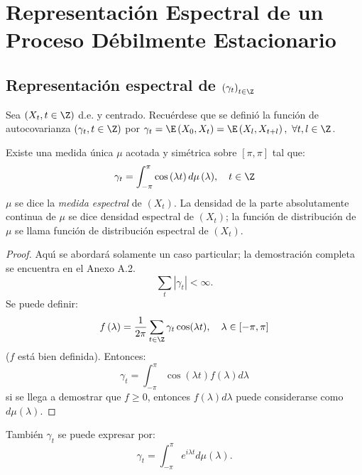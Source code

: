 \section{Representaci\'{o}n Espectral de un Proceso D\'{e}bilmente Estacionario}
\label{subsec:mylabel3}
\subsection{Representaci\'{o}n espectral de $\left( \gamma_{t} 
\right)_{t\in \Z}$ }
\label{subsubsec:mylabel1}

Sea $(X_{t}, t\in \Z)$ d.e. y centrado. Recu\'{e}rdese que se defini\'{o} la funci\'{o}n de autocovarianza $\left( \gamma_{t},t\in 
\Z \right)$ por $\gamma_{t}=\E\left( X_{0},X_{t} \right)=\E\left( X_{l},X_{t+l} \right),\ \forall t,l\in \Z$. 

\begin{teorema}
Existe una medida \'{u}nica $\mu $ acotada y sim\'{e}trica sobre $\left[ \pi ,\pi \right]$ tal que:
\[
\gamma_{t}=\int_{-\pi }^\pi {\cos \left( \lambda t \right)d\mu 
\left( \lambda \right)},\quad t\in \Z
\]
$\mu $ se dice la \emph{medida espectral} de $\left( X_{t} \right)$. La densidad de la parte 
absolutamente continua de $\mu $ se dice densidad espectral de $\left( X_{t} \right)$; la funci\'{o}n de distribuci\'{o}n de $\mu $ se llama funci\'{o}n de distribuci\'{o}n espectral de $\left( X_{t} \right)$.
 
\end{teorema}

\begin{proof}
Aqu\'{\i} se abordar\'{a} solamente un caso particular; la demostraci\'{o}n completa se encuentra en el Anexo A.2.
\[
\sum_t \left| \gamma_{t} \right| <\infty .
\]
Se puede definir:
\[
f\left( \lambda \right)=\frac{1}{2\pi }\sum_{t\in \Z} {\gamma 
_{t}\cos(\lambda t)} ,\quad \lambda \in 
\left[ -\pi ,\pi \right]
\]
($f$ est\'{a} bien definida). Entonces: 
\[
\gamma_{t}=\int_{-\pi }^\pi {\cos \left( \lambda t \right)f(\lambda 
)d\lambda } 
\]
si se llega a demostrar que $f\ge 0$, entonces $f(\lambda )d\lambda $ puede considerarse como $d\mu (\lambda )$.
\end{proof}

\begin{observacion}
Tambi\'{e}n $\gamma_{t}$ se puede expresar por: 
\[
\gamma_{t}=\int_{-\pi }^\pi {e^{i\lambda t}d\mu \left( \lambda 
\right)} .
\]
\end{observacion}

